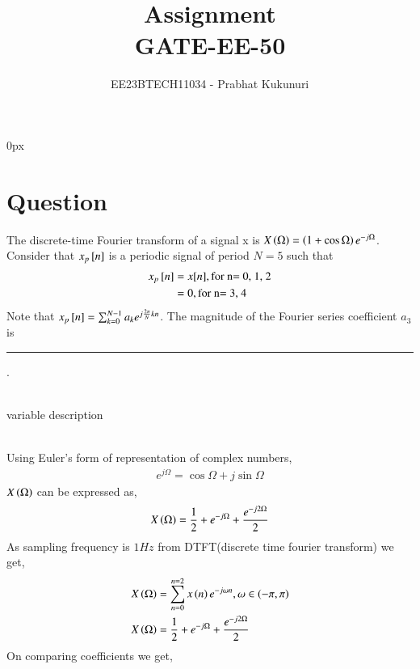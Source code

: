 \documentclass[journal,12pt,twocolumn]{IEEEtran}
\theoremstyle{remark}
\begin{document}
\parindent 0px


\vspace{3cm}

\title{Assignment\\[1ex]GATE-EE-50}
\author{EE23BTECH11034 - Prabhat Kukunuri$^{}$%
}
\maketitle
\newpage
\bigskip

\renewcommand{\thefigure}{\theenumi}
\renewcommand{\thetable}{\theenumi}
\section{Question}
The discrete-time Fourier transform of a signal x is $X\left(\Omega\right)=\left(1+\cos{\Omega}\right)e^{-j\Omega}$. Consider that $x_{p}{}\left[n\right]$ is a periodic signal of period $N=5$ such that
\begin{align}
    x_p{}\left[n\right]&=x[n],\text{for n= 0, 1, 2}\\
    &=0,\text{for n= 3, 4}
\end{align}
Note that $x_p{}\left[n\right]=\sum_{k=0}^{N-1}a_{k}e^{j\frac{2\pi}{N}kn}$. The magnitude of the Fourier series coefficient $a_3$ is \rule{3cm}{0.15mm} .\\
\solution\\
\begin{table}[h!]
    \centering
    
    \caption{variable description}
    \label{tab:my_label}
\end{table}\\
Using Euler's form of representation of complex numbers,
\begin{align}
    e^{j\Omega}=\cos{\Omega}+j\sin{\Omega}
\end{align}
$X\left(\Omega\right)$ can be expressed as,
\begin{align}
    X\left(\Omega\right)=\frac{1}{2}+e^{-j\Omega}+\frac{e^{-j2\Omega}}{2}
\end{align}
As sampling frequency is $1Hz$ \brak{\omega=\Omega} from DTFT(discrete time fourier transform) we get,
\begin{align}
    X\left(\Omega\right)&=\sum^{n=2}_{n=0}x\left(n\right)e^{-j\omega n},   \omega \in \left(-\pi,\pi\right)\\
    X\left(\Omega\right)&=\frac{1}{2}+e^{-j\Omega}+\frac{e^{-j2\Omega}}{2}
\end{align}
On comparing coefficients we get,
\end{document}
